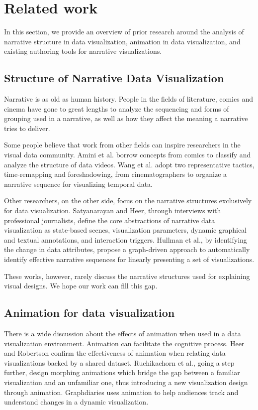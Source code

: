 \section {Related work}
In this section, we provide an overview of prior research around the analysis of narrative structure in data visualization, animation in data visualization, and existing authoring tools for narrative visualizations.

\subsection{Structure of Narrative Data Visualization}
Narrative is as old as human history\cite{cunningham_culture_2009}.  People in the fields of literature, comics \cite{cohn_visual_2013} and cinema \cite{schmidt_living_2017} have gone to great lengths to analyze the sequencing and forms of grouping used in a narrative, as well as how they affect the meaning a narrative tries to deliver. 

Some people believe that work from other fields can inspire researchers in the visual data community. Amini et al.\cite{amini_understanding_2015} borrow concepts from comics \cite{cohn_visual_2013} to classify and analyze the structure of data videos. Wang et al. \cite{wang_animated_2016} adopt two representative tactics, time-remapping and foreshadowing, from cinematographers to organize a narrative sequence for visualizing temporal data. 

Other researchers, on the other side, focus on the narrative structures exclusively for data visualization. 
Satyanarayan and Heer, through interviews with professional journalists\cite{satyanarayan_authoring_2014}, define the core abstractions of narrative data visualization as state-based scenes, visualization parameters, dynamic graphical and textual annotations, and interaction triggers. Hullman et al.\cite{hullman_deeper_2013}, by identifying the change in data attributes, propose a graph-driven approach to automatically identify effective narrative sequences for linearly presenting a set of visualizations. 

These works, however, rarely discuss the narrative structures used for explaining visual designs. We hope our work can fill this gap.
\subsection{Animation for data visualization}
There is a wide discussion about the effects of animation when used in a data visualization environment.
Animation can facilitate the cognitive process. Heer and Robertson \cite{heer_animated_2007-1} confirm the effectiveness of animation when relating data visualizations backed by a shared dataset. Ruchikachorn et al.\cite{ruchikachorn_learning_2015}, going a step further, design morphing animations which bridge the gap between a familiar visualization and an unfamiliar one, thus introducing a new visualization design through animation. Graphdiaries \cite{bach_graphdiaries:_2014} uses animation to help audiences track and understand changes in a dynamic visualization. 

